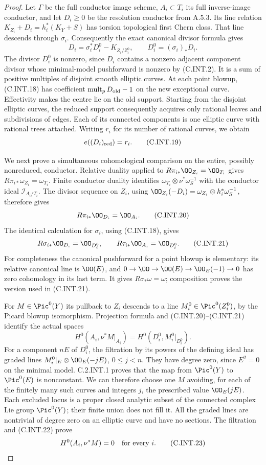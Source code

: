 \begin{proof}
Let $\Gamma$ be the full conductor image scheme,
$A_i\subset T_i$ its full inverse-image conductor,
and let $D_i\ge0$ be the resolution conductor from
A.5.3. Its line relation
$K_{Z_i}+D_i=h_i^*(K_Y+S)$ has torsion topological
first Chern class. That line descends through
$\sigma_i$. Consequently the exact canonical
divisor formula gives
\[
 D_i=\sigma_i^*D_i^0-K_{Z_i/Z_i^0},
 \qquad D_i^0=(\sigma_i)_*D_i.
 \tag{C.INT.18}
\]
The divisor $D_i^0$ is nonzero, since $D_i$ contains
a nonzero adjacent component divisor whose
minimal-model pushforward is nonzero by (C.INT.2).
It is a sum of positive multiples of disjoint
smooth elliptic curves. At each point blowup,
(C.INT.18) has coefficient
$\operatorname{mult}_pD_{\rm old}-1$ on the new
exceptional curve. Effectivity makes the centre
lie on the old support. Starting from the disjoint
elliptic curves, the reduced support consequently
acquires only rational leaves and subdivisions of
edges. Each of its connected components is one
elliptic curve with rational trees attached.
Writing $r_i$ for its number of rational curves,
we obtain
\[
 e((D_i)_{\rm red})=r_i.
 \tag{C.INT.19}
\]

We next prove a simultaneous cohomological
comparison on the entire, possibly nonreduced,
conductor. Relative duality applied to
$R\pi_{i*}\OO_{Z_i}=\OO_{T_i}$ gives
$R\pi_{i*}\omega_{Z_i}=\omega_{T_i}$.
Finite conductor duality identifies
$\omega_{T_i}\otimes\nu^*\omega_S^{-1}$ with
the conductor ideal $\mathcal I_{A_i/T_i}$.
The divisor sequence on $Z_i$, using
$\OO_{Z_i}(-D_i)=\omega_{Z_i}\otimes h_i^*\omega_S^{-1}$,
therefore gives
\[
 R\pi_{i*}\OO_{D_i}=\OO_{A_i}.
 \tag{C.INT.20}
\]
The identical calculation for $\sigma_i$, using
(C.INT.18), gives
\[
 R\sigma_{i*}\OO_{D_i}=\OO_{D_i^0},
 \qquad R\tau_{i*}\OO_{A_i}=\OO_{D_i^0}.
 \tag{C.INT.21}
\]
For completeness the canonical pushforward for a
point blowup is elementary: its relative canonical
line is $\OO(E)$, and
$0\to\OO\to\OO(E)\to\OO_E(-1)\to0$
has zero cohomology in its last term. It gives
$R\sigma_*\omega=\omega$; composition proves the
version used in (C.INT.21).

For $M\in\Pic^0(Y)$ its pullback to $Z_i$ descends
to a line $M_i^0\in\Pic^0(Z_i^0)$, by the Picard
blowup isomorphism. Projection formula and
(C.INT.20)--(C.INT.21) identify the actual spaces
\[
 H^0(A_i,\nu^*M|_{A_i})
   =H^0(D_i^0,M_i^0|_{D_i^0}).
 \tag{C.INT.22}
\]
For a component $nE$ of $D_i^0$, the filtration by
its powers of the defining ideal has graded lines
$M_i^0|_E\otimes\OO_E(-jE)$, $0\le j<n$.
They have degree zero, since $E^2=0$ on the
minimal model. C.2.INT.1 proves that the map from
$\Pic^0(Y)$ to $\Pic^0(E)$ is nonconstant. We can
therefore choose one $M$ avoiding, for each of
the finitely many such curves and integers $j$,
the prescribed value $\OO_E(jE)$.
Each excluded locus is a proper closed analytic
subset of the connected complex Lie group
$\Pic^0(Y)$; their finite union does not fill it.
All the graded lines are nontrivial of degree
zero on an elliptic curve and have no sections.
The filtration and (C.INT.22) prove
\[
 H^0(A_i,\nu^*M)=0\quad\hbox{for every }i.
 \tag{C.INT.23}
\]


\end{proof}
